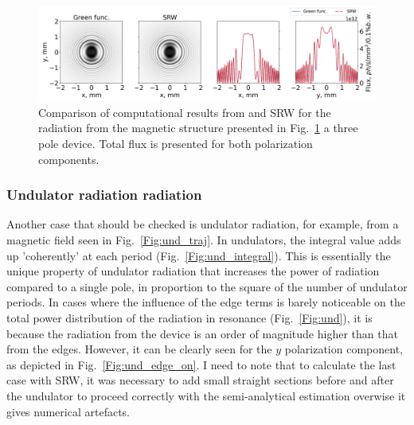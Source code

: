     \begin{figure}[p]
    	\centering
        \includegraphics[width=0.95\linewidth]{content/images/5_THz_Source/3pole.png}
        \captionsetup{justification=centering}
        \caption{Comparison of computational results from  and SRW for the radiation from the magnetic structure presented in Fig.~\ref{Fig:pole} a three pole device.  Total flux is presented for both polarization components.}
        \label{Fig:pole}
    \end{figure}

\subsubsection{Undulator radiation radiation}
    Another case that should be checked is undulator radiation, for example, from a magnetic field seen in Fig.~\ref{Fig:und_traj}. In undulators, the integral value adds up 'coherently' at each period (Fig.~\ref{Fig:und_integral}). This is essentially the unique property of undulator radiation that increases the power of radiation compared to a single pole, in proportion to the square of the number of undulator periods. In cases where the influence of the edge terms is barely noticeable on the total power distribution of the radiation in resonance (Fig.~\ref{Fig:und}), it is because the radiation from the device is an order of magnitude higher than that from the edges. However, it can be clearly seen for the $y$ polarization component, as depicted in Fig.~\ref{Fig:und_edge_on}. I need to note that to calculate the last case with SRW, it was necessary to add small straight sections before and after the undulator to proceed correctly with the semi-analytical estimation overwise it gives numerical artefacts.
    
